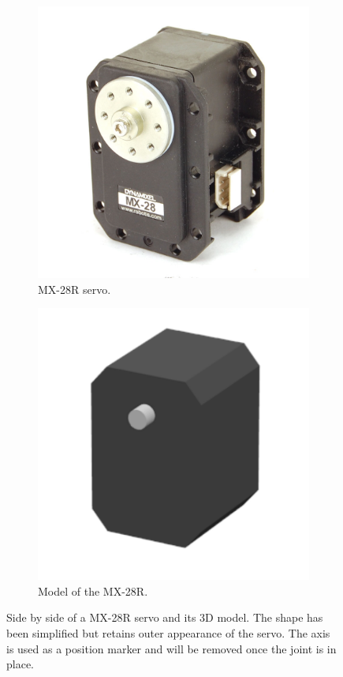 \begin{figure}[htp]
\center
\begin{subfigure}[b]{0.3\textwidth}
    \includegraphics[width = \textwidth]{figures/mx28}
    \caption{MX-28R servo.}
    \label{fig:mx28_real}
\end{subfigure}
\hfill
\begin{subfigure}[b]{0.3\textwidth}
    \includegraphics[width = \textwidth]{figures/mx28_model}
    \caption{Model of the MX-28R.}
    \label{fig:mx28_model}
\end{subfigure}
\caption[Side by side of a MX-28R servo and its 3D model]{Side by side of a MX-28R servo and its 3D model. The shape has been simplified but retains outer appearance of the servo. The axis is used as a position marker and will be removed once the joint is in place.}
\label{fig:servo}
\end{figure}

